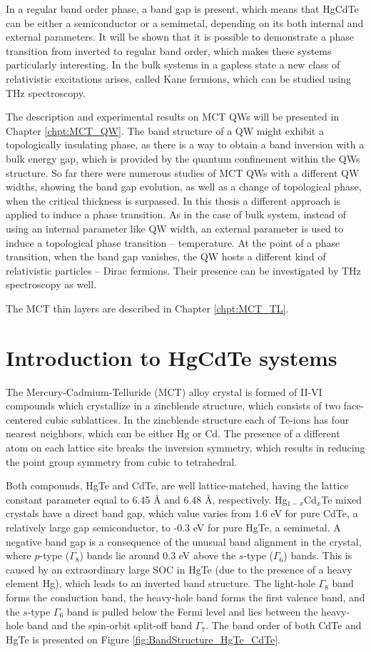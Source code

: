\documentclass[titlepage,a4paper]{book}
\newcommand{\wciecie}{\quad\phantom{v}}
\begin{document}
In a regular band order phase, a band gap is present, which means that HgCdTe can be either a semiconductor or a semimetal, depending on its both internal and external parameters. It will be shown that it is possible to demonstrate a phase transition from inverted to regular band order, which makes these systems particularly interesting. In the bulk systems in a gapless state a new class of relativistic excitations arises, called Kane fermions, which can be studied using THz spectroscopy.

The description and experimental results on MCT QWs will be presented in Chapter \ref{chpt:MCT_QW}. The band structure of a QW might exhibit a topologically insulating phase, as there is a way to obtain a band inversion with a bulk energy gap, which is provided by the quantum confinement within the QWs structure. So far there were numerous studies of MCT QWs with a different QW widths, showing the band gap evolution, as well as a change of topological phase, when the critical thickness is surpassed. In this thesis a different approach is applied to induce a phase transition. As in the case of bulk system, instead of using an internal parameter like QW width, an external parameter is used to induce a topological phase transition -- temperature. At the point of a phase transition, when the band gap vanishes, the QW hosts a different kind of relativistic particles -- Dirac fermions. Their presence can be investigated by THz spectroscopy as well. 

The MCT thin layers are described in Chapter \ref{chpt:MCT_TL}.  

\section{Introduction to HgCdTe systems}
\wciecie
The Mercury-Cadmium-Telluride (MCT) alloy crystal is formed of II-VI compounds which crystallize in a zincblende structure, which consists of two face-centered cubic sublattices. In the zincblende structure each of Te-ions has four nearest neighbors, which can be either Hg or Cd. The presence of a different atom on each lattice site breaks the inversion symmetry, which results in reducing the point group symmetry from cubic to tetrahedral. 

Both compounds, HgTe and CdTe, are well lattice-matched, having the lattice constant parameter equal to 6.45 Å and 6.48 Å, respectively. Hg$_{1-x}$Cd$_x$Te mixed crystals have a direct band gap, which value varies from 1.6 eV for pure CdTe, a relatively large gap semiconductor, to -0.3 eV for pure HgTe, a semimetal. A negative band gap is a consequence of the unusual band alignment in the crystal, where $p$-type ($\Gamma_8$) bands lie around 0.3 eV above the $s$-type ($\Gamma_6$) bands. This is caused by an extraordinary large SOC in HgTe (due to the presence of a heavy element Hg), which leads to an inverted band structure. The light-hole $\Gamma_8$ band forms the conduction band, the heavy-hole band forms the first valence band, and the $s$-type $\Gamma_6$ band is pulled below the Fermi level and lies between the heavy-hole band and the spin-orbit split-off band $\Gamma_7$. The band order of both CdTe and HgTe is presented on Figure \ref{fig:BandStructure_HgTe_CdTe}.
\end{document}
